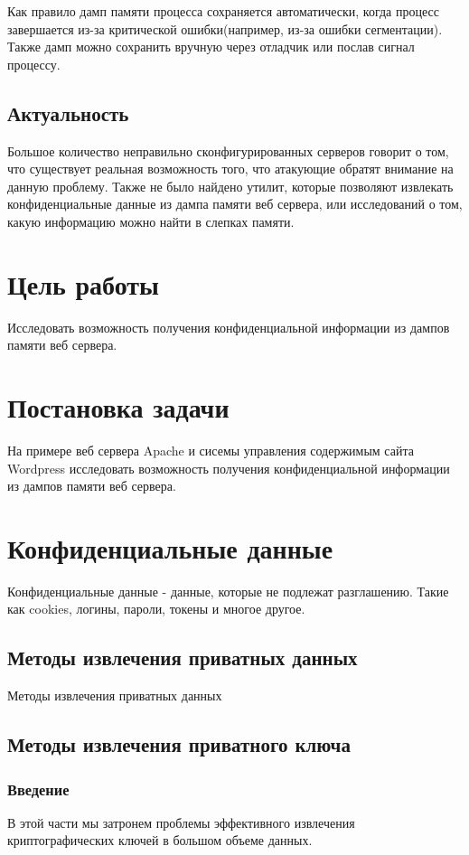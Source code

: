 \documentclass[20pt]{article}
\begin{document}
Как правило дамп памяти процесса сохраняется автоматически, когда процесс завершается из-за критической ошибки(например, из-за ошибки сегментации).
Также дамп можно сохранить вручную через отладчик или послав сигнал процессу.

\subsection{Актуальность}
Большое количество неправильно сконфигурированных серверов говорит о том, что существует реальная возможность того, что атакующие
обратят внимание на данную проблему. Также не было найдено утилит, которые позволяют извлекать конфиденциальные данные из дампа памяти веб сервера,
или исследований о том, какую информацию можно найти в слепках памяти.

\section{Цель работы}
Исследовать возможность получения конфиденциальной информации из дампов памяти веб сервера.

\section{Постановка задачи}
На примере веб сервера Apache и сисемы управления содержимым сайта Wordpress исследовать возможность получения конфиденциальной информации
из дампов памяти веб сервера.

\section{Конфиденциальные данные}
Конфиденциальные данные - данные, которые не подлежат разглашению. Такие как cookies, логины, пароли, токены и многое другое.

\subsection{Методы извлечения приватных данных}
Методы извлечения приватных данных

\subsection{Методы извлечения приватного ключа}
\subsubsection{Введение}
В этой части мы затронем проблемы эффективного извлечения криптографических ключей в большом объеме данных.
\end{document}
